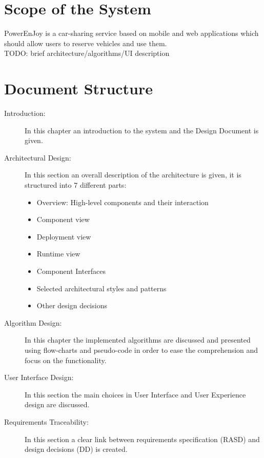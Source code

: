 \section{Scope of the System}
PowerEnJoy is a car-sharing service based on mobile and web applications which should allow users to reserve vehicles and use them.
\\TODO: brief architecture/algorithms/UI description
\section{Document Structure}
\begin{description} 
	\item[Introduction: ] In this chapter an introduction to the system and the Design Document is given.
	\item[Architectural Design: ] In this section an overall description of the architecture is given, it is structured into 7 different parts: 
		\begin{itemize}
			\item Overview: High-level components and their interaction
			\item Component view
			\item Deployment view
			\item Runtime view
			\item Component Interfaces
			\item Selected architectural styles and patterns
			\item Other design decisions
		\end{itemize}
	\item[Algorithm Design: ] In this chapter the implemented algorithms are discussed and presented using flow-charts and pseudo-code in order to ease the comprehension and focus on the functionality.
	\item[User Interface Design: ] In this section the main choices in User Interface and User Experience design are discussed.
	\item[Requirements Traceability: ] In this section a clear link between requirements specification (RASD) and design decisions (DD) is created.
\end{description}